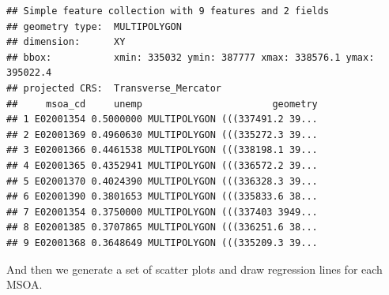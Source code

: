\documentclass[
]{book}
\newenvironment{Shaded}{\begin{snugshade}}{\end{snugshade}}
\newcommand{\CommentTok}[1]{\textcolor[rgb]{0.56,0.35,0.01}{\textit{#1}}}
\newcommand{\DataTypeTok}[1]{\textcolor[rgb]{0.13,0.29,0.53}{#1}}
\newcommand{\DecValTok}[1]{\textcolor[rgb]{0.00,0.00,0.81}{#1}}
\newcommand{\KeywordTok}[1]{\textcolor[rgb]{0.13,0.29,0.53}{\textbf{#1}}}
\newcommand{\NormalTok}[1]{#1}
\newcommand{\OperatorTok}[1]{\textcolor[rgb]{0.81,0.36,0.00}{\textbf{#1}}}
\newcommand{\StringTok}[1]{\textcolor[rgb]{0.31,0.60,0.02}{#1}}
\begin{document}
\begin{verbatim}
## Simple feature collection with 9 features and 2 fields
## geometry type:  MULTIPOLYGON
## dimension:      XY
## bbox:           xmin: 335032 ymin: 387777 xmax: 338576.1 ymax: 395022.4
## projected CRS:  Transverse_Mercator
##     msoa_cd     unemp                       geometry
## 1 E02001354 0.5000000 MULTIPOLYGON (((337491.2 39...
## 2 E02001369 0.4960630 MULTIPOLYGON (((335272.3 39...
## 3 E02001366 0.4461538 MULTIPOLYGON (((338198.1 39...
## 4 E02001365 0.4352941 MULTIPOLYGON (((336572.2 39...
## 5 E02001370 0.4024390 MULTIPOLYGON (((336328.3 39...
## 6 E02001390 0.3801653 MULTIPOLYGON (((335833.6 38...
## 7 E02001354 0.3750000 MULTIPOLYGON (((337403 3949...
## 8 E02001385 0.3707865 MULTIPOLYGON (((336251.6 38...
## 9 E02001368 0.3648649 MULTIPOLYGON (((335209.3 39...
\end{verbatim}

\begin{Shaded}
\end{Shaded}

And then we generate a set of scatter plots and draw regression lines for each MSOA.

\begin{Shaded}
\end{Shaded}
\end{document}
